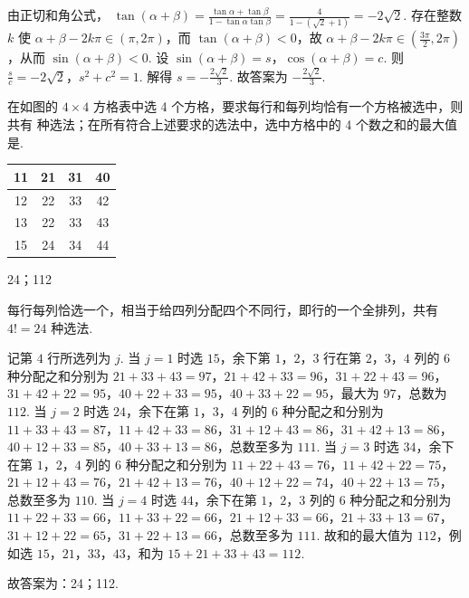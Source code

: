\begin{solution}
由正切和角公式，
\(\tan(\alpha+\beta)=\frac{\tan\alpha+\tan\beta}{1-\tan\alpha\tan\beta} =\frac{4}{1-(\sqrt2+1)}=-2\sqrt2\).
存在整数 \(k\) 使 \(\alpha+\beta-2k\pi\in(\pi,2\pi)\)，而 \(\tan(\alpha+\beta)<0\)，故 \(\alpha+\beta-2k\pi\in\left(\frac{3\pi}{2},2\pi\right)\)，从而
\(\sin(\alpha+\beta)<0\).
设
\(\sin(\alpha+\beta)=s\)，\(\cos(\alpha+\beta)=c\).
则
\(\frac{s}{c}=-2\sqrt2\)，\(s^2+c^2=1\).
解得
\(s=-\frac{2\sqrt2}{3}\).
故答案为 \(-\frac{2\sqrt2}{3}\).
\end{solution}

\begin{problem}
在如图的 \(4\times 4\) 方格表中选 4 个方格，要求每行和每列均恰有一个方格被选中，则共有\fillinblank{} 种选法；在所有符合上述要求的选法中，选中方格中的 4 个数之和的最大值是\fillinblank{}.

\begin{center}
\begin{tabular}{|c|c|c|c|}
\hline
11 & 21 & 31 & 40 \\
\hline
12 & 22 & 33 & 42 \\
\hline
13 & 22 & 33 & 43 \\
\hline
15 & 24 & 34 & 44 \\
\hline
\end{tabular}
\end{center}
\end{problem}

\begin{answer}
24；112
\end{answer}

\begin{solution}
每行每列恰选一个，相当于给四列分配四个不同行，即行的一个全排列，共有
\(4!=24\)
种选法.

记第 \(4\) 行所选列为 \(j\). 当 \(j=1\) 时选 \(15\)，余下第 \(1\)，\(2\)，\(3\) 行在第 \(2\)，\(3\)，\(4\) 列的 \(6\) 种分配之和分别为 \(21+33+43=97\)，\(21+42+33=96\)，\(31+22+43=96\)，\(31+42+22=95\)，\(40+22+33=95\)，\(40+33+22=95\)，最大为 \(97\)，总数为 \(112\). 当 \(j=2\) 时选 \(24\)，余下在第 \(1\)，\(3\)，\(4\) 列的 \(6\) 种分配之和分别为 \(11+33+43=87\)，\(11+42+33=86\)，\(31+12+43=86\)，\(31+42+13=86\)，\(40+12+33=85\)，\(40+33+13=86\)，总数至多为 \(111\). 当 \(j=3\) 时选 \(34\)，余下在第 \(1\)，\(2\)，\(4\) 列的 \(6\) 种分配之和分别为 \(11+22+43=76\)，\(11+42+22=75\)，\(21+12+43=76\)，\(21+42+13=76\)，\(40+12+22=74\)，\(40+22+13=75\)，总数至多为 \(110\). 当 \(j=4\) 时选 \(44\)，余下在第 \(1\)，\(2\)，\(3\) 列的 \(6\) 种分配之和分别为 \(11+22+33=66\)，\(11+33+22=66\)，\(21+12+33=66\)，\(21+33+13=67\)，\(31+12+22=65\)，\(31+22+13=66\)，总数至多为 \(111\). 故和的最大值为 \(112\)，例如选 \(15\)，\(21\)，\(33\)，\(43\)，和为 \(15+21+33+43=112\).

故答案为：24；112.
\end{solution}
